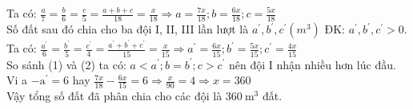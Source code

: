 \begin{bt}
{\begin{enumerate}
Ta có: $\frac{a}{7}=\frac{b}{6}=\frac{c}{5}=\frac{a+b+c}{18}=\frac{x}{18} \Rightarrow a=\frac{7 x}{18} ; b=\frac{6 x}{18} ; c=\frac{5 x}{18}$\\
Số đất sau đó chia cho ba đội I, II, III lần lượt là $a^{\prime}, b^{\prime}, c^{\prime}\left(m^3\right)$ ĐK: $a^{\prime}, b^{\prime}, c^{\prime}>0$.\\
Ta có: $\frac{a^{\prime}}{6}=\frac{b^{\prime}}{5}=\frac{c^{\prime}}{4}=\frac{a^{\prime}+b^{\prime}+c^{\prime}}{15}=\frac{x}{15} \Rightarrow a^{\prime}=\frac{6 x}{15} ; b^{\prime}=\frac{5 x}{15} ; c^{\prime}=\frac{4 x}{15}$\\
So sánh (1) và (2) ta có: $a<a^{\prime} ; b=b^{\prime} ; c>c^{\prime}$ nên đội I nhận nhiều hơn lúc đầu.\\
Vi a $-\mathrm{a}^{\prime}=6$ hay $\frac{7 x}{18}-\frac{6 x}{15}=6 \Rightarrow \frac{x}{90}=4 \Rightarrow x=360$\\
Vậy tổng số đất đã phân chia cho các đội là $360 \mathrm{~m}^3$ đất.
    \end{enumerate}
} 
\end{bt}

